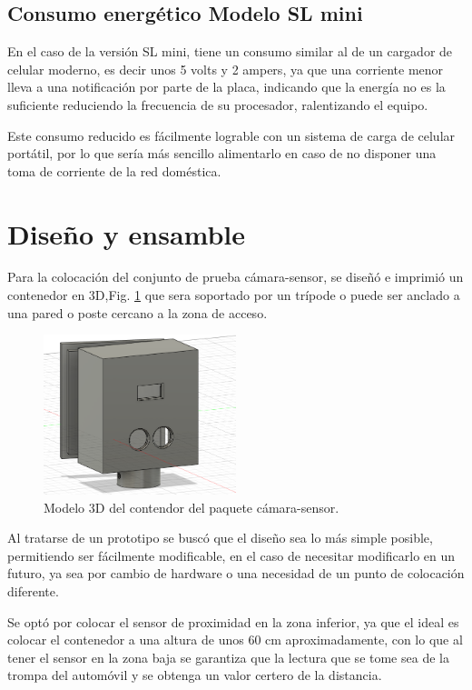 \subsection{Consumo energético Modelo SL mini}

En el caso de la versión SL mini, tiene un consumo similar al de un cargador de celular moderno, es decir unos 5 volts y
2 ampers, ya que una corriente menor lleva a una notificación por parte de la placa, indicando que la energía no es la
suficiente reduciendo la frecuencia de su procesador, ralentizando el equipo.

Este consumo reducido es fácilmente lograble con un sistema de carga de celular portátil, por lo que sería más sencillo
alimentarlo en caso de no disponer una toma de corriente de la red doméstica.

\section{Diseño y ensamble}

Para la colocación del conjunto de prueba cámara-sensor, se diseñó e imprimió un contenedor en 3D,Fig. \ref{fig:contenedor-camara}
que sera soportado por un trípode o puede ser anclado a una pared o poste cercano a la zona de acceso.
\begin{figure}
    \centering
    \includegraphics[width=0.5\textwidth]{imgs/contenedor-camara.png}
    \caption{Modelo 3D del contendor del paquete cámara-sensor.}
    \label{fig:contenedor-camara}
\end{figure}

Al tratarse de un prototipo se buscó que el diseño sea lo más simple posible, permitiendo ser fácilmente modificable, en el caso de necesitar
modificarlo en un futuro, ya sea por cambio de hardware o una necesidad de un punto de colocación diferente.

Se optó por colocar el sensor de proximidad en la zona inferior, ya que el ideal es colocar el contenedor a una altura de unos 60 cm
aproximadamente, con lo que al tener el sensor en la zona baja se garantiza que la lectura que se tome sea de la trompa del automóvil y se
obtenga un valor certero de la distancia.


